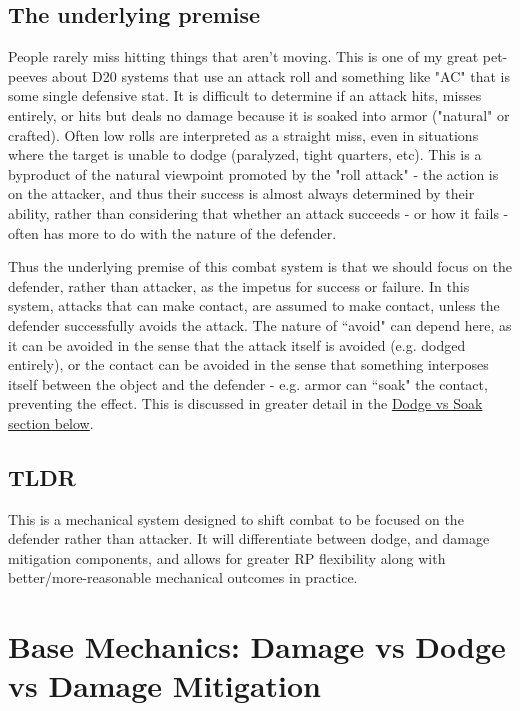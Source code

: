 \documentclass{article}
\begin{document}
    \subsection{The underlying premise} 
        People rarely miss hitting things that aren't moving. This is one of my great pet-peeves about D20 systems that use an attack roll and something like "AC" that is some single defensive stat. It is difficult to determine if an attack hits, misses entirely, or hits but deals no damage because it is soaked into armor ("natural" or crafted). Often low rolls are interpreted as a straight miss, even in situations where the target is unable to dodge (paralyzed, tight quarters, etc). This is a byproduct of the natural viewpoint promoted by the "roll attack" - the action is on the attacker, and thus their success is almost always determined by their ability, rather than considering that whether an attack succeeds - or how it fails - often has more to do with the nature of the defender.
        
        Thus the underlying premise of this combat system is that we should focus on the defender, rather than attacker, as the impetus for success or failure. In this system, attacks that can make contact, are assumed to make contact, unless the defender successfully avoids the attack. The nature of ``avoid" can depend here, as it can be avoided in the sense that the attack itself is avoided (e.g. dodged entirely), or the contact can be avoided in the sense that something interposes itself between the object and the defender - e.g. armor can ``soak" the contact, preventing the effect. This is discussed in greater detail in the \hyperref[sec:baseMechanics]{Dodge vs Soak section below}.
        
    \subsection{TLDR}
        This is a mechanical system designed to shift combat to be focused on the defender rather than attacker. It will differentiate between dodge, and damage mitigation components, and allows for greater RP flexibility along with better/more-reasonable mechanical outcomes in practice.
        
    
    
    

\section{Base Mechanics: Damage vs Dodge vs Damage Mitigation}\label{sec:baseMechanics}
    
\end{document}

